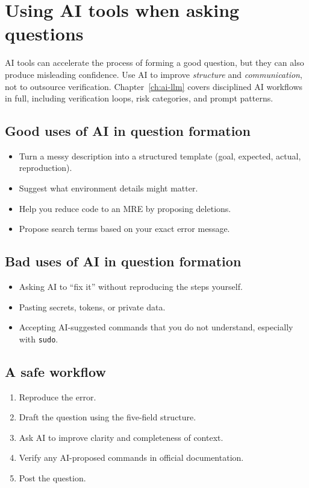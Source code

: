 \section{Using AI tools when asking questions}
AI tools can accelerate the process of forming a good question, but they can also produce misleading confidence. Use AI to improve \emph{structure} and \emph{communication}, not to outsource verification. Chapter~\ref{ch:ai-llm} covers disciplined AI workflows in full, including verification loops, risk categories, and prompt patterns.

\subsection{Good uses of AI in question formation}
\begin{itemize}[noitemsep]
  \item Turn a messy description into a structured template (goal, expected, actual, reproduction).
  \item Suggest what environment details might matter.
  \item Help you reduce code to an MRE by proposing deletions.
  \item Propose search terms based on your exact error message.
\end{itemize}

\subsection{Bad uses of AI in question formation}
\begin{itemize}[noitemsep]
  \item Asking AI to ``fix it'' without reproducing the steps yourself.
  \item Pasting secrets, tokens, or private data.
  \item Accepting AI-suggested commands that you do not understand, especially with \texttt{sudo}.
\end{itemize}

\subsection{A safe workflow}
\begin{enumerate}[noitemsep]
  \item Reproduce the error.
  \item Draft the question using the five-field structure.
  \item Ask AI to improve clarity and completeness of context.
  \item Verify any AI-proposed commands in official documentation.
  \item Post the question.
\end{enumerate}

